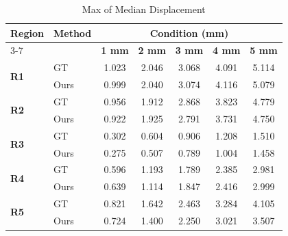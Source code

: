 \documentclass{article}
\begin{document}
\thispagestyle{empty}

\begin{table}[h]
\centering
\caption{Max of Median Displacement}
\vspace{0.3cm}
\begin{tabular}{llccccc}
\toprule
\textbf{Region} & \textbf{Method} & \multicolumn{5}{c}{\textbf{Condition (mm)}} \\
\cmidrule(lr){3-7}
& & \textbf{1 mm} & \textbf{2 mm} & \textbf{3 mm} & \textbf{4 mm} & \textbf{5 mm} \\
\midrule
\multirow{2}{*}{\textbf{R1}} & GT  & 1.023 & 2.046 & 3.068 & 4.091 & 5.114 \\
 & Ours  & 0.999 & 2.040 & 3.074 & 4.116 & 5.079 \\ \midrule
\multirow{2}{*}{\textbf{R2}} & GT  & 0.956 & 1.912 & 2.868 & 3.823 & 4.779 \\
 & Ours  & 0.922 & 1.925 & 2.791 & 3.731 & 4.750 \\ \midrule
\multirow{2}{*}{\textbf{R3}} & GT  & 0.302 & 0.604 & 0.906 & 1.208 & 1.510 \\
 & Ours  & 0.275 & 0.507 & 0.789 & 1.004 & 1.458 \\ \midrule
\multirow{2}{*}{\textbf{R4}} & GT  & 0.596 & 1.193 & 1.789 & 2.385 & 2.981 \\
 & Ours  & 0.639 & 1.114 & 1.847 & 2.416 & 2.999 \\ \midrule
\multirow{2}{*}{\textbf{R5}} & GT  & 0.821 & 1.642 & 2.463 & 3.284 & 4.105 \\
 & Ours  & 0.724 & 1.400 & 2.250 & 3.021 & 3.507 \\
\bottomrule
\end{tabular}
\end{table}
\end{document}
